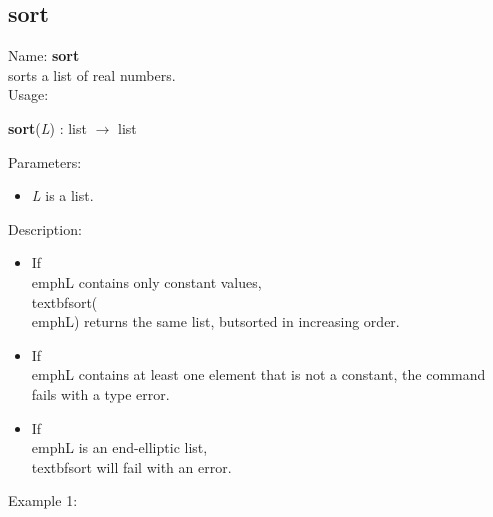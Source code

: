 \subsection{sort}
\label{labsort}
\noindent Name: \textbf{sort}\\
sorts a list of real numbers.\\
\noindent Usage: 
\begin{center}
\textbf{sort}(\emph{L}) : \textsf{list} $\rightarrow$ \textsf{list}\\
\end{center}
Parameters: 
\begin{itemize}
\item \emph{L} is a list.
\end{itemize}
\noindent Description: \begin{itemize}

\item If \\emph{L} contains only constant values, \\textbf{sort}(\\emph{L}) returns the same list, but\n   sorted in increasing order.\n
\item If \\emph{L} contains at least one element that is not a constant, the command fails \n   with a type error.\n
\item If \\emph{L} is an end-elliptic list, \\textbf{sort} will fail with an error.\n\end{itemize}
\noindent Example 1: 
\begin{center}\begin{minipage}{15cm}\begin{Verbatim}[frame=single]
\end{Verbatim}
\end{minipage}\end{center}
